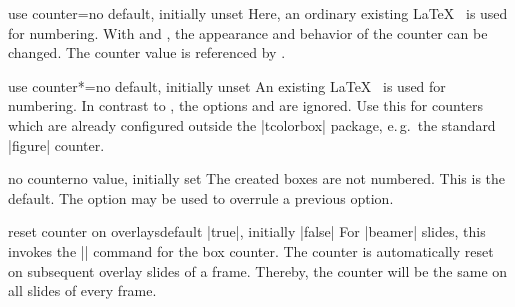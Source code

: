 \begin{newTcbKey}{use counter}{=}{no default, initially unset}
Here, an ordinary existing \LaTeX\  is used for numbering.
With  and
, the appearance and behavior of the counter
can be changed. The counter value is referenced by .

\end{newTcbKey}


\begin{newTcbKey}[][doc new=2014-09-19]{use counter*}{=}{no default, initially unset}
An existing \LaTeX\  is used for numbering. In contrast to
, the options  and
 are ignored. Use this for counters which
are already configured outside the |tcolorbox| package, e.\,g.\ the standard
|figure| counter.
\end{newTcbKey}


\begin{newTcbKey}{no counter}{}{no value, initially set}
The created boxes are not numbered. This is the default. The option may
be used to overrule a previous option.
\end{newTcbKey}

\enlargethispage*{1cm}

\begin{newTcbKey}[][doc new=2019-10-18]{reset counter on overlays}{}{default |true|, initially |false|}
For |beamer| slides, this invokes the |\resetcounteronoverlays| command
for the box counter. The counter is automatically reset on subsequent
overlay slides of a frame.
Thereby, the counter will be the same on all slides of every frame.
\end{newTcbKey}


